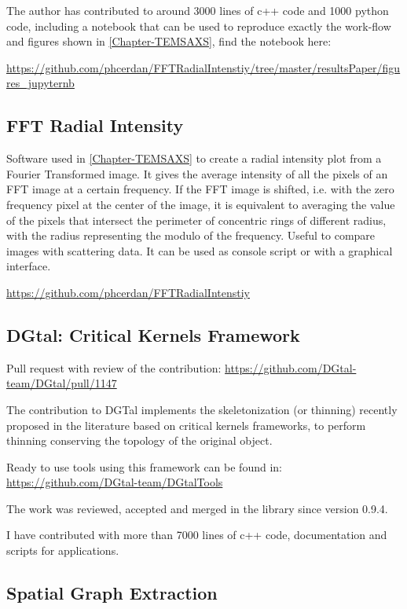 The author has contributed to around 3000 lines of c++ code and 1000 python code, including a notebook that can be used to reproduce exactly the work-flow and figures shown in \autoref{Chapter-TEMSAXS}, find the notebook here:

\noindent\url{https://github.com/phcerdan/FFTRadialIntenstiy/tree/master/resultsPaper/figures_jupyternb}

\subsection{FFT Radial Intensity}%
\label{sub:contribution_fft_radial_intensity}

Software used in \autoref{Chapter-TEMSAXS} to create a radial intensity plot from a Fourier Transformed image.
It gives the average intensity of all the pixels of an FFT image at a certain frequency. If the FFT image is shifted, i.e. with the zero frequency pixel at the center of the image,
it is equivalent to averaging the value of the pixels that intersect the perimeter of concentric rings of different radius, with the radius representing the modulo of the frequency.
Useful to compare images with scattering data. It can be used as console script or with a graphical interface.

\url{https://github.com/phcerdan/FFTRadialIntenstiy}

\subsection{DGtal: Critical Kernels Framework}%
\label{sub:contribution_dgtal}

Pull request with review of the contribution:
\url{https://github.com/DGtal-team/DGtal/pull/1147}

The contribution to DGTal implements the skeletonization (or thinning) recently proposed in the
literature \cite{couprie_3d_2015, bertrand_parallel_2017} based on critical kernels frameworks, to perform thinning conserving the topology of the original object.

Ready to use tools using this framework can be found in:
\url{https://github.com/DGtal-team/DGtalTools}

The work was reviewed, accepted and merged in the library since version 0.9.4.

I have contributed with more than 7000 lines of c++ code, documentation and scripts for applications.

\subsection{Spatial Graph Extraction}%
\label{sub:spatial_graph_extraction}

